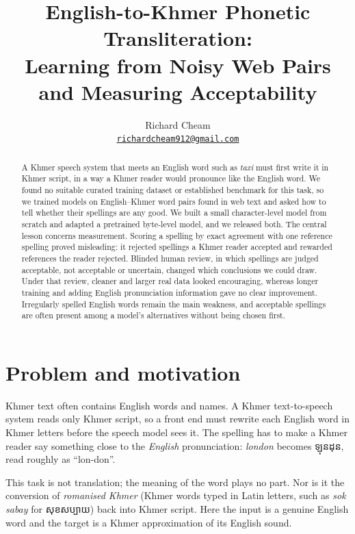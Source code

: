 \documentclass[10pt,a4paper,twocolumn]{article}
\title{English-to-Khmer Phonetic Transliteration:\\ Learning from Noisy Web Pairs and Measuring Acceptability}
\author{Richard Cheam\\ \small \href{mailto:richardcheam912@gmail.com}{\texttt{richardcheam912@gmail.com}}}
\date{}
\newcommand{\km}[1]{{\khmerfont #1}}
\begin{document}
\maketitle

\begin{abstract}
\noindent
A Khmer speech system that meets an English word such as \emph{taxi} must first write it in Khmer script, in a way
a Khmer reader would pronounce like the English word. We found no suitable curated training dataset or established
benchmark for this task, so we trained models on English--Khmer word pairs found in web text and asked how to tell
whether their spellings are any good. We built a small character-level model from scratch and adapted a pretrained byte-level model, and we
released both. The central lesson concerns measurement. Scoring a spelling by exact agreement with one reference
spelling proved misleading: it rejected spellings a Khmer reader accepted and rewarded references the reader
rejected. Blinded human review, in which spellings are judged acceptable, not acceptable or uncertain, changed which
conclusions we could draw. Under that review, cleaner and larger real data looked encouraging, whereas longer
training and adding English pronunciation information gave no clear improvement. Irregularly spelled English words
remain the main weakness, and acceptable spellings are often present among a model's alternatives without being
chosen first.
\end{abstract}

\section{Problem and motivation}
\label{sec:intro}

Khmer text often contains English words and names. A Khmer text-to-speech system reads only Khmer script, so a
front end must rewrite each English word in Khmer letters before the speech model sees it. The spelling has to make
a Khmer reader say something close to the \emph{English} pronunciation: \emph{london} becomes \km{ឡុនដុន}, read
roughly as ``lon-don''.

This task is not translation; the meaning of the word plays no part. Nor is it the conversion of \emph{romanised
Khmer} (Khmer words typed in Latin letters, such as \emph{sok sabay} for \km{សុខសប្បាយ}) back into Khmer script.
Here the input is a genuine English word and the target is a Khmer approximation of its English sound.
\end{document}

